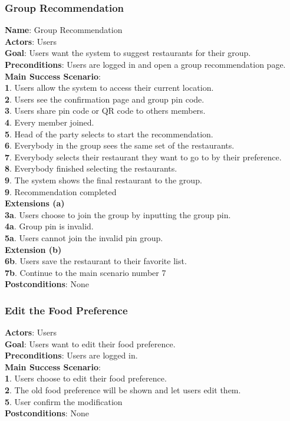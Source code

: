 \documentclass[12pt,oneside,openright,a4paper]{cpe-english-project}
\begin{document}
\subsubsection{Group Recommendation}
\textbf{Name}: Group Recommendation\\
\textbf{Actors}: Users\\
\textbf{Goal}: Users want the system to suggest restaurants for their group.\\
\textbf{Preconditions}: Users are logged in and open a group recommendation page.\\
\textbf{Main Success Scenario}: \\
\textbf{1}. Users allow the system to access their current location.\\
\textbf{2}. Users see the confirmation page and group pin code.\\
\textbf{3}. Users share pin code or QR code to others members.\\
\textbf{4}. Every member joined.\\
\textbf{5}. Head of the party selects to start the recommendation.\\
\textbf{6}. Everybody in the group sees the same set of the restaurants.\\
\textbf{7}. Everybody selects their restaurant they want to go to by their preference.\\
\textbf{8}. Everybody finished selecting the restaurants.\\
\textbf{9}. The system shows the final restaurant to the group.\\
\textbf{9}. Recommendation completed\\
\textbf{Extensions (a)} \\
\textbf{3a}. Users choose to join the group by inputting the group pin.\\
\textbf{4a}. Group pin is invalid.\\
\textbf{5a}. Users cannot join the invalid pin group.\\
\textbf{Extension (b)} \\
\textbf{6b}. Users save the restaurant to their favorite list.\\
\textbf{7b}. Continue to the main scenario number 7\\
\textbf{Postconditions}: None

\subsubsection{Edit the Food Preference}
\textbf{Actors}: Users\\
\textbf{Goal}: Users want to edit their food preference.\\
\textbf{Preconditions}: Users are logged in.\\
\textbf{Main Success Scenario}: \\
\textbf{1}. Users choose to edit their food preference.\\
\textbf{2}. The old food preference will be shown and let users edit them.\\
\textbf{5}. User confirm the modification\\
\textbf{Postconditions}: None
\end{document}
